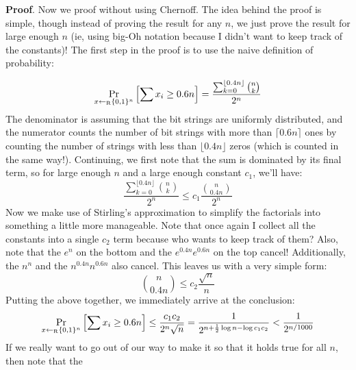 \documentclass{article}
\begin{document}
\begin{enumerate}[,start=3]
\begin{enumerate}[,label=\Roman*)]
\begin{enumerate}[noitemsep,topsep=\mdcompacttopsep,label=\alph*.]
\begin{mdbmarginx}{1ex}{0pt}{1ex}{0pt}%
\noindent{}\textbf{Proof}.  Now we proof without using Chernoff. The idea behind the proof is simple, though instead of proving the result
for any $n$, we just prove the result for large enough $n$ (ie, using big-Oh notation because I didn't want to keep
track of the constants)! The first step in the proof is to use the naive definition of probability:%
\end{mdbmarginx}%
\noindent\noindent\[%
\Pr_{x \getsr \zo^n}\left[\sum x_i \geq 0.6n \right] = \frac{\sum_{k=0}^{\lfloor 0.4n \rfloor} {n \choose k}}{2^n}
\]%
The denominator is assuming that the bit strings are uniformly distributed, and the numerator counts the
number of bit strings with more than $\lceil 0.6n \rceil$ ones by counting the number of strings with less
than $\lfloor 0.4n \rfloor$ zeros (which is counted in the same way!). Continuing, we first note that
the sum is dominated by its final term, so for large enough $n$ and a large enough constant $c_1$, we'll have:
\noindent\noindent\[%
\frac{\sum_{k=0}^{\lfloor 0.4n \rfloor} {n \choose k}}{2^n} \leq c_1\frac{ {n \choose 0.4n }}{2^n}
\]%
Now we make use of Stirling's approximation to simplify the factorials into something a little more manageable.
Note that once again I collect all the constants into a single $c_2$ term because who wants to keep track
of them? Also, note that the $e^n$ on the bottom and the $e^{0.4n}e^{0.6n}$ on the top cancel! Additionally,
the $n^n$ and the $n^{0.4n}n^{0.6n}$ also cancel. This leaves us with a very simple form:
\noindent\noindent\[%
{n \choose 0.4n} \leq c_2\frac{\sqrt{n}}{n}
\]%
Putting the above together, we immediately arrive at the conclusion:
\noindent\noindent\[%
\Pr_{x \getsr \zo^n}\left[\sum x_i \geq 0.6n \right] \leq \frac{c_1c_2}{2^{n}\sqrt{n}} = \frac{1}{2^{n + \frac{1}{2} \log n - \log c_1 c_2}} < \frac{1}{2^{n/1000}}
\]%
If we really want to go out of our way to make it so that it holds true for all $n$, then note that the

\end{enumerate}
\end{enumerate}
\end{enumerate}
\end{document}
